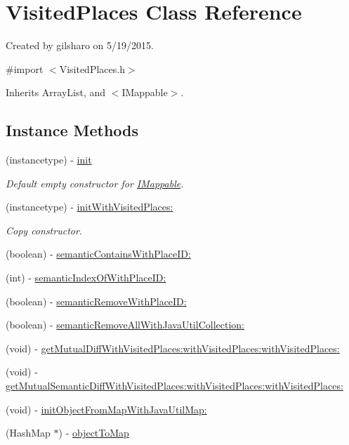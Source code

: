 \hypertarget{interface_visited_places}{}\section{Visited\+Places Class Reference}
\label{interface_visited_places}


Created by gilsharo on 5/19/2015.  




{\ttfamily \#import $<$Visited\+Places.\+h$>$}



Inherits Array\+List, and $<$\+I\+Mappable$>$.

\subsection*{Instance Methods}
\begin{DoxyCompactItemize}
\item 
(instancetype) -\/ \hyperlink{interface_visited_places_aeae4fe5c014d0fb52af4a05b2d34c763}{init}
\begin{DoxyCompactList}\small\item\em Default empty constructor for \hyperlink{class_i_mappable-p}{I\+Mappable}. \end{DoxyCompactList}\item 
(instancetype) -\/ \hyperlink{interface_visited_places_a932e27ed741826d2725e2d00e6ae614d}{init\+With\+Visited\+Places\+:}
\begin{DoxyCompactList}\small\item\em Copy constructor. \end{DoxyCompactList}\item 
(boolean) -\/ \hyperlink{interface_visited_places_a0be0fd13da2e7566898a94dbef161338}{semantic\+Contains\+With\+Place\+I\+D\+:}
\item 
(int) -\/ \hyperlink{interface_visited_places_a88ff9d0982e011775e8258873bf8e689}{semantic\+Index\+Of\+With\+Place\+I\+D\+:}
\item 
(boolean) -\/ \hyperlink{interface_visited_places_a542a48a3b67bcfb6d1d58736ef665740}{semantic\+Remove\+With\+Place\+I\+D\+:}
\item 
(boolean) -\/ \hyperlink{interface_visited_places_a9f72179d56db0f1bbd820ba06c631519}{semantic\+Remove\+All\+With\+Java\+Util\+Collection\+:}
\item 
(void) -\/ \hyperlink{interface_visited_places_a6684802d9ac9077bc06c78eb825ff862}{get\+Mutual\+Diff\+With\+Visited\+Places\+:with\+Visited\+Places\+:with\+Visited\+Places\+:}
\item 
(void) -\/ \hyperlink{interface_visited_places_a94d5efddfc0591f435c1aef24ae48dd9}{get\+Mutual\+Semantic\+Diff\+With\+Visited\+Places\+:with\+Visited\+Places\+:with\+Visited\+Places\+:}
\item 
(void) -\/ \hyperlink{interface_visited_places_ad20dcdbb4e49f505775dd1d84b19af42}{init\+Object\+From\+Map\+With\+Java\+Util\+Map\+:}
\item 
(Hash\+Map $\ast$) -\/ \hyperlink{interface_visited_places_ae38f01e2ae3ed4d7ee40d41b57048474}{object\+To\+Map}
\end{DoxyCompactItemize}


